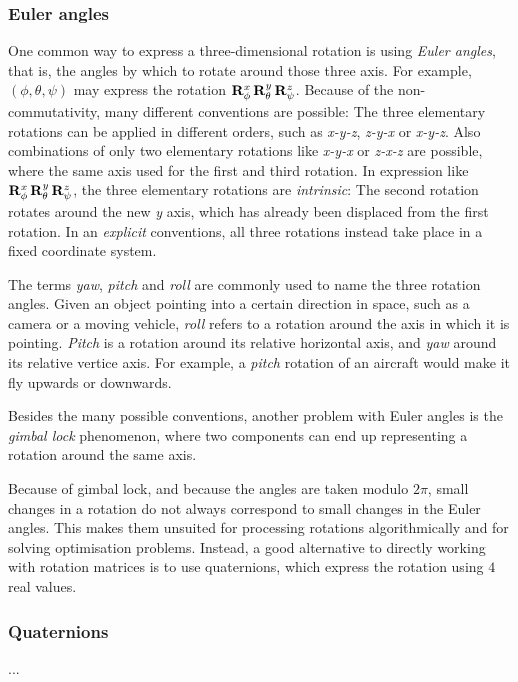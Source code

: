 \subsubsection{Euler angles}
One common way to express a three-dimensional rotation is using \emph{Euler angles}, that is, the angles by which to rotate around those three axis. For example, $(\phi, \theta, \psi)$ may express the rotation $\mathbf{R}_{\phi}^x \, \mathbf{R}_{\theta}^y \, \mathbf{R}_{\psi}^z$. Because of the non-commutativity, many different conventions are possible: The three elementary rotations can be applied in different orders, such as \emph{x-y-z}, \emph{z-y-x} or \emph{x-y-z}. Also combinations of only two elementary rotations like \emph{x-y-x} or \emph{z-x-z} are possible, where the same axis used for the first and third rotation. In expression like $\mathbf{R}_{\phi}^x \, \mathbf{R}_{\theta}^y \, \mathbf{R}_{\psi}^z$, the three elementary rotations are \emph{intrinsic}: The second rotation rotates around the new \emph{y} axis, which has already been displaced from the first rotation. In an \emph{explicit} conventions, all three rotations instead take place in a fixed coordinate system.

The terms \emph{yaw}, \emph{pitch} and \emph{roll} are commonly used to name the three rotation angles. Given an object pointing into a certain direction in space, such as a camera or a moving vehicle, \emph{roll} refers to a rotation around the axis in which it is pointing. \emph{Pitch} is a rotation around its relative horizontal axis, and \emph{yaw} around its relative vertice axis. For example, a \emph{pitch} rotation of an aircraft would make it fly upwards or downwards.

Besides the many possible conventions, another problem with Euler angles is the \emph{gimbal lock} phenomenon, where two components can end up representing a rotation around the same axis.

Because of gimbal lock, and because the angles are taken modulo $2\pi$, small changes in a rotation do not always correspond to small changes in the Euler angles. This makes them unsuited for processing rotations algorithmically and for solving optimisation problems. Instead, a good alternative to directly working with rotation matrices is to use quaternions, which express the rotation using $4$ real values.

\subsubsection{Quaternions}
...

